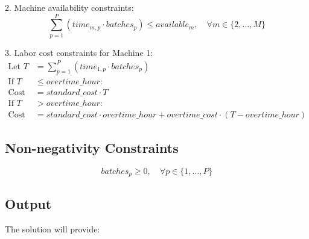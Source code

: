 \documentclass{article}
\begin{document}
2. Machine availability constraints:
\[
\sum_{p=1}^{P} (time_{m,p} \cdot batches_{p}) \leq available_{m}, \quad \forall m \in \{2, \ldots, M\}
\]

3. Labor cost constraints for Machine 1:
\begin{align*}
\text{Let } T & = \sum_{p=1}^{P} (time_{1,p} \cdot batches_{p}) \\
\text{If } T & \leq overtime\_hour: \\
\text{Cost} & = standard\_cost \cdot T \\
\text{If } T & > overtime\_hour: \\
\text{Cost} & = standard\_cost \cdot overtime\_hour + overtime\_cost \cdot (T - overtime\_hour)
\end{align*}

\subsection*{Non-negativity Constraints}
\[
batches_{p} \geq 0, \quad \forall p \in \{1, \ldots, P\}
\]

\subsection*{Output}
The solution will provide:
\end{document}
